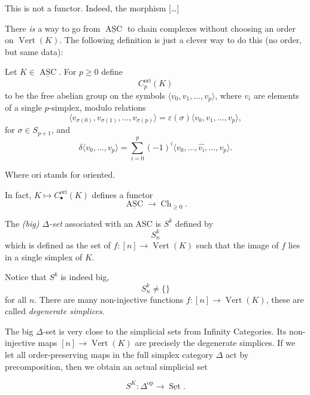 This is not a functor.
Indeed, the morphism […]

There {\it is} a way to go from
$\underline{\operatorname{ASC}}$
to chain complexes without choosing
an order on $\operatorname{Vert}(K)$. The
following definition is just a clever way to
do this (no order, but same data):

\begin{definition}
\label{definition-chain-cx-asc}
Let $K \in \underline{\operatorname{ASC}}$.
For $p \geq 0$ define 
$$
C^{\operatorname{ori}}_p(K)
$$
to be the free abelian group
on the symbols $\langle
v_0,v_1,\dots,v_p\rangle$,
where $v_i$ are elements of a single
$p$-simplex, modulo relations
$$
\langle v_{\sigma(0)},
v_{\sigma(1)},\dots,
v_{\sigma(p)}\rangle
=
\varepsilon(\sigma)
\langle v_0,v_1,\dots,v_p\rangle,
$$
for $\sigma \in S_{p+1}$,
and
$$
\delta \langle v_0,\dots,v_p\rangle
=
\sum_{i=0}^p (-1)^i
\langle
v_0,\dots,\widehat{v_i},\dots,v_p\rangle.
$$
\end{definition}

Where ori stands for oriented.

In fact, $K \mapsto
C_\bullet^{\operatorname{ori}}(K)$
defines a functor
$$
\underline{\operatorname{ASC}} 
\to \operatorname{Ch}_{\geq 0}.
$$

\begin{definition}
\label{definition-big-delta-set}
The {\it (big) $\Delta$-set} associated
with an ASC is $S^k$ defined by
$$
S_n^k
$$
which is defined as the set of
$f:[n] \to \operatorname{Vert}(K)$
such that the image of $f$ lies in
a single simplex of $K$.

Notice that $S^k$ is indeed big,
$$
S_n^k \neq  \{\}
$$
for all $n$. There are many non-injective
functions $f : [n] \to
\operatorname{Vert}(K)$,
these are called {\it degenerate simplices}.

\end{definition}


\begin{remark}
\label{remark-big-delta-set-simplicial-set}
The big $\Delta$-set is very close to the
simplicial sets from Infinity Categories.
Its non-injective maps $[n]\to
\operatorname{Vert}(K)$ are precisely the
degenerate simplices. If we let all
order-preserving maps in the full simplex
category $\Delta$ act by precomposition, then
we obtain an actual simplicial set

$$
S^K:\Delta^{\operatorname{op}}
\to \underline{\operatorname{Set}}.
$$

\end{remark}



